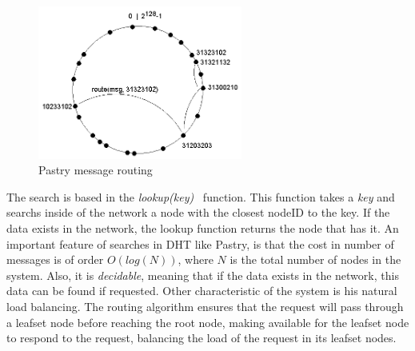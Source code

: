 \begin{figure}
\center
\includegraphics[width=0.6\textwidth]{img/pastryrouting}
\caption{Pastry message routing}
\label{fig:p2p_pastry_routing}
\end{figure}


The search is based in the \textit{lookup(key)}~\cite{BalakrishnanEtAl03} function.
This function takes a \textit{key} and searchs inside of the network a node with
the closest nodeID to the key. If the data exists in the network, the lookup
function returns the node that has it. An important feature of searches in DHT
like Pastry, is that the cost in number of messages is of order $O(log(N))$,
where $N$ is the total number of nodes in the system. Also, it is
\textit{decidable}, meaning that if the data exists in the network, this data
can be found if requested. Other characteristic of the system is his natural
load balancing. The routing algorithm ensures that the request will pass through
a leafset node before reaching the root node, making available for the leafset
node to respond to the request, balancing the load of the request in its
leafset nodes.


